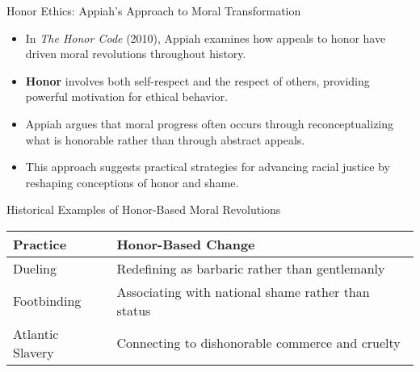 \documentclass{beamer}
\begin{document}
	\begin{frame}{Honor Ethics: Appiah's Approach to Moral Transformation}
		\begin{itemize}
			\item In \textit{The Honor Code} (2010), Appiah examines how appeals to honor have driven moral revolutions throughout history.
			\item \textbf{Honor} involves both self-respect and the respect of others, providing powerful motivation for ethical behavior.
			\item Appiah argues that moral progress often occurs through reconceptualizing what is honorable rather than through abstract appeals.
			\item This approach suggests practical strategies for advancing racial justice by reshaping conceptions of honor and shame.
		\end{itemize}
		
		\begin{exampleblock}{Historical Examples of Honor-Based Moral Revolutions}
			\begin{tabular}{|l|l|}
				\hline
				\textbf{Practice} & \textbf{Honor-Based Change} \\
				\hline
				Dueling & Redefining as barbaric rather than gentlemanly \\
				Footbinding & Associating with national shame rather than status \\
				Atlantic Slavery & Connecting to dishonorable commerce and cruelty \\
				\hline
			\end{tabular}
		\end{exampleblock}
	\end{frame}
	
\end{document}
